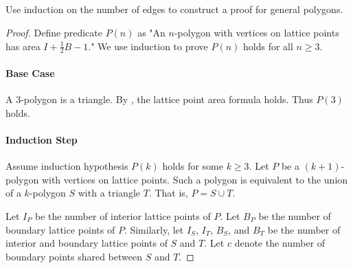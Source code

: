 \documentclass{report}
\begin{document}
\subsection{}%
\label{sub:exercise-1.7.4c}

Use induction on the number of edges to construct a proof for general polygons.

\begin{proof}

  Define predicate $P(n)$ as "An $n$-polygon with vertices on lattice points has
    area $I + \frac{1}{2}B - 1$."
  We use induction to prove $P(n)$ holds for all $n \geq 3$.

  \paragraph{Base Case}%

    A $3$-polygon is a triangle.
    By , the lattice point area formula holds.
    Thus $P(3)$ holds.

  \paragraph{Induction Step}%

    Assume induction hypothesis $P(k)$ holds for some $k \geq 3$.
    Let $P$ be a $(k + 1)$-polygon with vertices on lattice points.
    Such a polygon is equivalent to the union of a $k$-polygon $S$ with a
      triangle $T$.
    That is, $P = S \cup T$.

    Let $I_P$ be the number of interior lattice points of $P$.
    Let $B_P$ be the number of boundary lattice points of $P$.
    Similarly, let $I_S$, $I_T$, $B_S$, and $B_T$ be the number of interior
      and boundary lattice points of $S$ and $T$.
    Let $c$ denote the number of boundary points shared between $S$ and $T$.


\end{proof}
\end{document}
